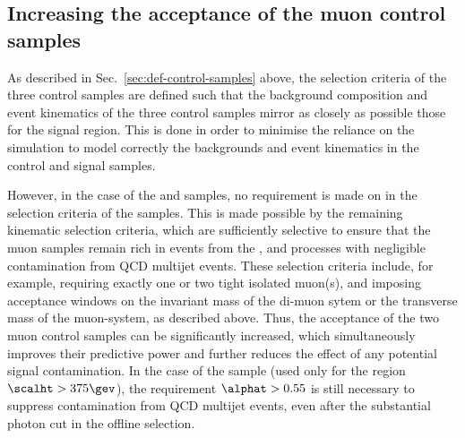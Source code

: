\subsection{Increasing the acceptance of the muon control samples\label{sec:larger}}

As described in Sec.~\ref{sec:def-control-samples} above, the
selection criteria of the three control samples are defined such that
the background composition and event kinematics of the three control
samples mirror as closely as possible those for the signal
region. This is done in order to minimise the reliance on the
simulation to model correctly the backgrounds and event kinematics in
the control and signal samples.

However, in the case of the \mj and \mmj samples, no requirement is
made on \alphat in the selection criteria of the samples. This is made
possible by the remaining kinematic selection criteria, which are
sufficiently selective to ensure that the muon samples remain rich in
events from the \wj, \ttbar and \zmumu processes with negligible
contamination from QCD multijet events. These selection criteria
include, for example, requiring exactly one or two tight isolated
muon(s), and imposing acceptance windows on the invariant mass of the
di-muon sytem or the transverse mass of the muon-\pfmet system, as
described above. 
Thus, the acceptance of the two muon control samples can be
significantly increased, which simultaneously improves their
predictive power and further reduces the effect of any potential
signal contamination.  In the case of the \gj sample (used only for
the region $\scalht > 375\gev$), the requirement $\alphat > 0.55$ is
still necessary to suppress contamination from QCD multijet events,
even after the substantial photon \pt cut in the offline selection.

